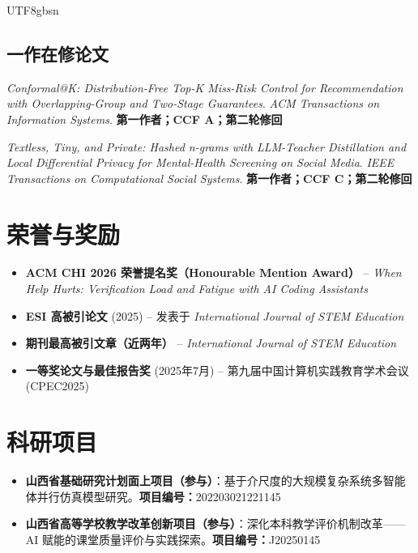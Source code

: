 \documentclass[a4paper,10pt]{article}
\newcommand{\pubitem}[1]{\item #1}
\newcommand{\cvlabel}[1]{\textbf{#1}}
\begin{document}
\begin{CJK*}{UTF8}{gbsn}
\subsection*{一作在修论文}

\begin{enumerate}[label={[R\arabic*]}]
    \pubitem{\textit{Conformal@K: Distribution-Free Top-K Miss-Risk Control for Recommendation with Overlapping-Group and Two-Stage Guarantees}. \textit{ACM Transactions on Information Systems}. \textbf{第一作者；CCF A；第二轮修回}}
    
    \pubitem{\textit{Textless, Tiny, and Private: Hashed n-grams with LLM-Teacher Distillation and Local Differential Privacy for Mental-Health Screening on Social Media}. \textit{IEEE Transactions on Computational Social Systems}. \textbf{第一作者；CCF C；第二轮修回}}
\end{enumerate}

\section*{荣誉与奖励}

\begin{itemize}[leftmargin=*]
    \item \textbf{ACM CHI 2026 荣誉提名奖（Honourable Mention Award）} -- \textit{When Help Hurts: Verification Load and Fatigue with AI Coding Assistants}
    \item \textbf{ESI 高被引论文} (2025) -- 发表于 \textit{International Journal of STEM Education}
    \item \textbf{期刊最高被引文章（近两年）} -- \textit{International Journal of STEM Education}
    \item \textbf{一等奖论文与最佳报告奖} (2025年7月) -- 第九届中国计算机实践教育学术会议 (CPEC2025)
\end{itemize}

\section*{科研项目}

\begin{itemize}[leftmargin=*, topsep=0.2ex, itemsep=0.2ex]
    \item \cvlabel{山西省基础研究计划面上项目（参与）}：基于介尺度的大规模复杂系统多智能体并行仿真模型研究。\;\cvlabel{项目编号：}202203021221145
    \item \cvlabel{山西省高等学校教学改革创新项目（参与）}：深化本科教学评价机制改革——AI 赋能的课堂质量评价与实践探索。\;\cvlabel{项目编号：}J20250145
\end{itemize}


\end{CJK*}
\end{document}
